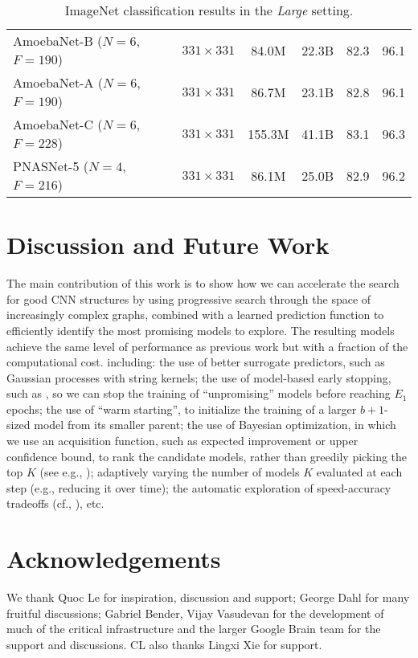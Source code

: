 \documentclass[runningheads]{llncs}
\begin{document}
\begin{table}[t]
\begin{center}
\begin{tabular}{lccccc}
        AmoebaNet-B ($N=6$, $F=190$) \cite{DBLP:journals/corr/abs-1802-01548} & $331 \times 331$ & 84.0M & 22.3B & 82.3 & 96.1 \\
        AmoebaNet-A ($N=6$, $F=190$) \cite{DBLP:journals/corr/abs-1802-01548} & $331 \times 331$ & 86.7M & 23.1B & 82.8 & 96.1 \\
        AmoebaNet-C ($N=6$, $F=228$) \cite{DBLP:journals/corr/abs-1802-01548} & $331 \times 331$ & 155.3M & 41.1B & 83.1 & 96.3 \\
        \midrule
        PNASNet-5 ($N=4$, $F=216$) & $331 \times 331$ & 86.1M & 25.0B & 82.9 & 96.2 \\
    \bottomrule
    \end{tabular}
\end{center}
\caption{ImageNet classification results in the \textit{Large} setting.}
\label{tab:imagenet-large}
\end{table}

\section{Discussion and Future Work}\label{sec:discuss}

The main contribution of this work is to show how we can accelerate the search for good CNN structures by using progressive search through the space of increasingly complex graphs, combined with a learned prediction function to efficiently identify the most promising models to explore.
The resulting models achieve the same level of performance as previous work but with a fraction of the computational cost.
including:
the use of better surrogate predictors,
such as Gaussian processes with string kernels;
the use of model-based early stopping,
such as 
\cite{Baker2017acc},
so we can stop the training of ``unpromising'' models before reaching $E_1$ epochs;
the use of ``warm starting'', to initialize the training of a larger $b+1$-sized model
 from its smaller parent;
 the use of Bayesian optimization,
in which we use an acquisition function,
such as expected improvement or upper confidence bound,
to rank the candidate models, rather than greedily picking the top $K$
(see e.g., \cite{Snoek2012,Shahriari2016});
adaptively varying the number of models $K$ evaluated at each step (e.g., reducing it over time);
the automatic exploration of speed-accuracy tradeoffs (cf., \cite{PPPnet}),
etc.


\clearpage
\section*{Acknowledgements}
We thank Quoc Le for inspiration, discussion and support; George Dahl for many fruitful discussions; Gabriel Bender, Vijay Vasudevan for the development of much of the critical infrastructure and the larger Google Brain team for the support and discussions. CL also thanks Lingxi Xie for support.
\end{document}
